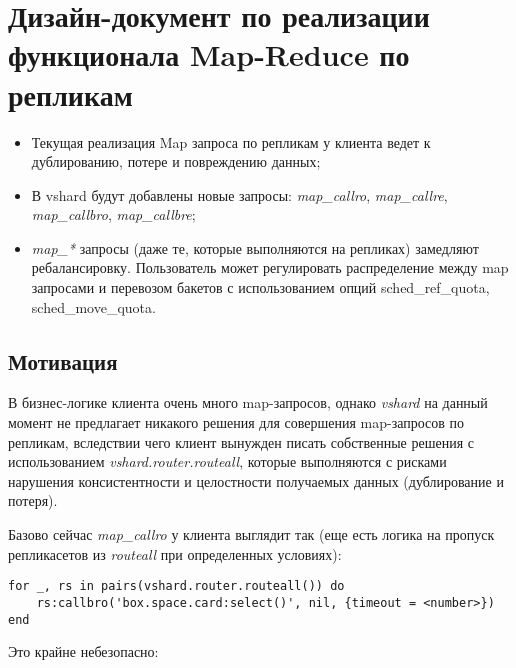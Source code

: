 \section{Дизайн-документ по реализации функционала Map-Reduce по репликам}

\begin{itemize}
    \item Текущая реализация Map запроса по репликам у клиента ведет к
    дублированию, потере и повреждению данных;
    \item В vshard будут добавлены новые запросы: \textit{map_callro},
        \textit{map_callre}, \textit{map_callbro}, \textit{map_callbre};
    \item \textit{map_*} запросы (даже те, которые выполняются на репликах)
        замедляют ребалансировку. Пользователь может регулировать распределение
        между map запросами и перевозом бакетов с использованием опций
        sched_ref_quota, sched_move_quota.
\end{itemize}

\subsection{Мотивация}

В бизнес-логике клиента очень много map-запросов, однако \textit{vshard} на
данный момент не предлагает никакого решения для совершения map-запросов по
репликам, вследствии чего клиент вынужден писать собственные решения с
использованием \textit{vshard.router.routeall}, которые выполняются с рисками
нарушения консистентности и целостности получаемых данных (дублирование и
потеря).

Базово сейчас \textit{map_callro} у клиента выглядит так (еще есть логика на
пропуск репликасетов из \textit{routeall} при определенных условиях):

\begin{verbatim}
for _, rs in pairs(vshard.router.routeall()) do
    rs:callbro('box.space.card:select()', nil, {timeout = <number>})
end
\end{verbatim}

Это крайне небезопасно:

